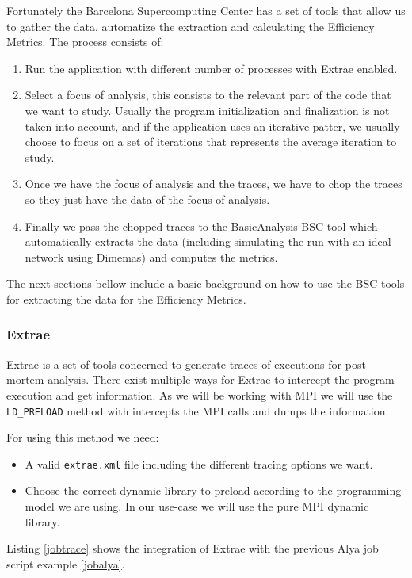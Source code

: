 \noindent
Fortunately the Barcelona Supercomputing Center has a set of tools that allow us to gather the data, automatize the extraction and calculating the Efficiency Metrics. The process consists of:
\begin{enumerate}
  \item Run the application with different number of processes with Extrae enabled.
  \item Select a focus of analysis, this consists to the relevant part of the code that we want to study. Usually the program initialization and finalization is not taken into account, and if the application uses an iterative patter, we usually choose to focus on a set of iterations that represents the average iteration to study.
  \item Once we have the focus of analysis and the traces, we have to chop the traces so they just have the data of the focus of analysis.
  \item Finally we pass the chopped traces to the BasicAnalysis BSC tool which automatically extracts the data (including simulating the run with an ideal network using Dimemas) and computes the metrics. 
\end{enumerate}

The next sections bellow include a basic background on how to use the BSC tools for extracting the data for the Efficiency Metrics.

\subsubsection{Extrae}

Extrae\cite{extrae} is a set of tools concerned to generate traces of executions for post-mortem analysis. There exist multiple ways for Extrae to intercept the program execution and get information. As we will be working with MPI we will use the \texttt{LD\_PRELOAD} method with intercepts the MPI calls and dumps the information.

For using this method we need:
\begin{itemize}
  \item A valid \texttt{extrae.xml} file including the different tracing options we want. 
  \item Choose the correct dynamic library to preload according to the programming model we are using. In our use-case we will use the pure MPI dynamic library. 
\end{itemize}

\noindent
Listing \ref{jobtrace} shows the integration of Extrae with the previous Alya job script example \ref{jobalya}.

